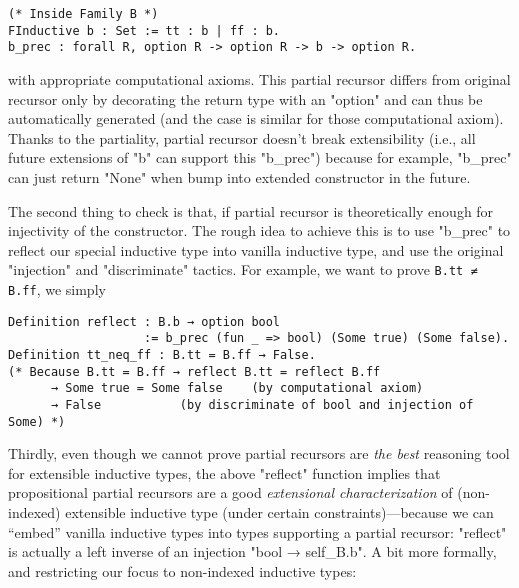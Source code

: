 \begin{verbatim}
(* Inside Family B *)
FInductive b : Set := tt : b | ff : b.
b_prec : forall R, option R -> option R -> b -> option R.
\end{verbatim}
with appropriate computational axioms.  This partial
recursor differs from original recursor only by decorating the return
type with an "option" and can thus be automatically generated (and
the case is similar for those computational axiom). Thanks to the
partiality, partial recursor doesn't break
extensibility (i.e., all future extensions of "b" can support this
"b_prec") because for example, "b_prec" can just return "None" when bump into extended constructor in the future. 

The second thing to check is that, if partial recursor is theoretically enough for injectivity of the constructor. The rough idea to achieve this
is to use "b_prec" to reflect our special inductive type into vanilla
inductive type, and use the original "injection" and "discriminate"
tactics. For example, we want to prove \texttt{B.tt ≠
B.ff}, we simply 
\begin{verbatim}
Definition reflect : B.b → option bool 
                   := b_prec (fun _ => bool) (Some true) (Some false).
Definition tt_neq_ff : B.tt = B.ff → False.
(* Because B.tt = B.ff → reflect B.tt = reflect B.ff 
      → Some true = Some false    (by computational axiom)
      → False           (by discriminate of bool and injection of Some) *)
\end{verbatim}


Thirdly, even though we cannot prove partial recursors are \textit{the
best} reasoning tool for extensible inductive types,
the above "reflect" function implies that propositional partial
recursors are a good \textit{extensional characterization} of
(non-indexed) extensible inductive type (under certain
constraints)---because we can ``embed'' vanilla inductive types into
types supporting a partial recursor: "reflect" is actually a left
inverse of an injection "bool → self_B.b". A bit more formally, and
restricting our focus to non-indexed inductive types:

